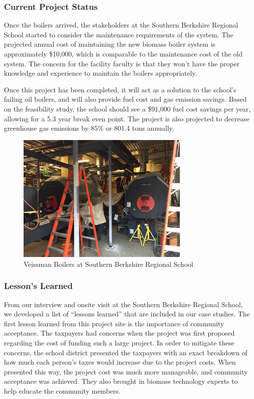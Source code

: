 \subsubsection{Current Project Status}
\par Once the boilers arrived, the stakeholders at the Southern Berkshire Regional School started to consider the maintenance requirements of the system. The projected annual cost of maintaining the new biomass boiler system is approximately \$10,000, which is comparable to the maintenance cost of the old system. The concern for the facility faculty is that they won’t have the proper knowledge and experience to maintain the boilers appropriately.
\par Once this project has been completed, it will act as a solution to the school’s failing oil boilers, and will also provide fuel cost and gas emission savings. Based on the feasibility study, the school should see a \$91,000 fuel cost savings per year, allowing for a 5.3 year break even point. The project is also projected to decrease greenhouse gas emissions by 85\% or 801.4 tons annually.

\begin{figure}[H]
\centering
\includegraphics[width=0.75\textwidth]{findingschapter/southernberkshireboilers}
\caption{Veissman Boilers at Southern Berkshire Regional School}
\end{figure}

\subsubsection{Lesson’s Learned}
\par From our interview and onsite visit at the Southern Berkshire Regional School, we developed a list of “lessons learned” that are included in our case studies. The first lesson learned from this project site is the importance of community acceptance. The taxpayers had concerns when the project was first proposed regarding the cost of funding such a large project. In order to mitigate these concerns, the school district presented the taxpayers with an exact breakdown of how much each person’s taxes would increase due to the project costs. When presented this way, the project cost was much more manageable, and community acceptance was achieved. They also brought in biomass technology experts to help educate the community members.

